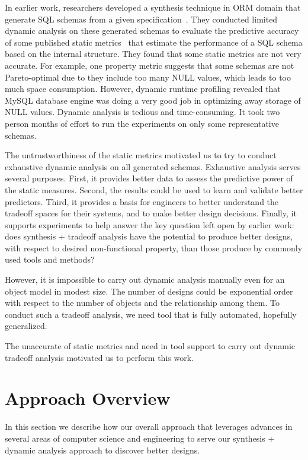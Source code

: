 In earlier work, researchers developed a synthesis technique in ORM domain that generate SQL schemas from a given specification~\cite{trademaker}. They conducted limited dynamic analysis on these generated schemas to evaluate the predictive accuracy of some published static metrics~\cite{orm_metrics} that estimate the performance of a SQL schema based on the internal structure. They found that some static metrics are not very accurate. For example, one property metric suggests that some schemas are not Pareto-optimal due to they include too many NULL values, which leads to too much space consumption. However, dynamic runtime profiling revealed that MySQL database engine was doing a very good job in optimizing away storage of NULL values. Dynamic analysis is tedious and time-consuming. It took two person months of effort to run the experiments on only some representative schemas.

The untrustworthiness of the static metrics motivated us to try to conduct exhaustive dynamic analysis on all generated schemas. Exhaustive analysis serves several purposes. First, it provides better data to assess the predictive power of the static measures. Second, the results could be used to learn and validate better predictors. Third, it provides a basis for engineers to better understand the tradeoff spaces for their systems, and to make better design decisions. Finally, it supports experiments to help answer the key question left open by earlier work: does synthesis + tradeoff analysis have the potential to produce better designs, with respect to desired non-functional property, than those produce by commonly used tools and methods?

However, it is impossible to carry out dynamic analysis manually even for an object model in modest size. The number of designs could be exponential order with respect to the number of objects and the relationship among them. To conduct such a tradeoff analysis, we need tool that is fully automated, hopefully generalized.

The unaccurate of static metrics and need in tool support to carry out dynamic tradeoff analysis motivated us to perform this work.

\section{Approach Overview}
\label{approach}

In this section we describe how our overall approach that leverages advances in several areas of computer science and engineering to serve our synthesis + dynamic analysis approach to discover better designs.


